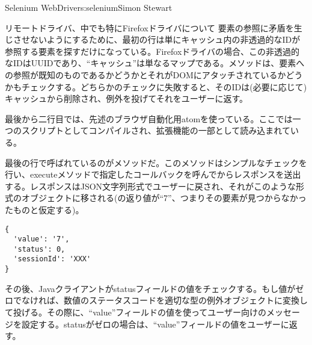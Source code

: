 \begin{aosachapter}{Selenium WebDriver}{s:selenium}{Simon Stewart}
\begin{aosasect1}{リモートドライバ、中でも特にFirefoxドライバについて}
\noindent 要素の参照に矛盾を生じさせないようにするために、最初の行は単にキャッシュ内の非透過的なIDが参照する要素を探すだけになっている。Firefoxドライバの場合、この非透過的なIDはUUIDであり、``キャッシュ''は単なるマップである。メソッドは、要素への参照が既知のものであるかどうかとそれがDOMにアタッチされているかどうかもチェックする。どちらかのチェックに失敗すると、そのIDは(必要に応じて)キャッシュから削除され、例外を投げてそれをユーザーに返す。

最後から二行目では、先述のブラウザ自動化用atomを使っている。ここでは一つのスクリプトとしてコンパイルされ、拡張機能の一部として読み込まれている。

最後の行で呼ばれているのがメソッドだ。このメソッドはシンプルなチェックを行い、executeメソッドで指定したコールバックを呼んでからレスポンスを送出する。レスポンスはJSON文字列形式でユーザーに戻され、それがこのような形式のオブジェクトに移される(の返り値が``7''、つまりその要素が見つからなかったものと仮定する)。

\begin{verbatim}
{
  'value': '7',
  'status': 0,
  'sessionId': 'XXX'
}
\end{verbatim}

その後、Javaクライアントがstatusフィールドの値をチェックする。もし値がゼロでなければ、数値のステータスコードを適切な型の例外オブジェクトに変換して投げる。その際に、``value''フィールドの値を使ってユーザー向けのメッセージを設定する。statusがゼロの場合は、``value''フィールドの値をユーザーに返す。


\end{aosasect1}
\end{aosachapter}

